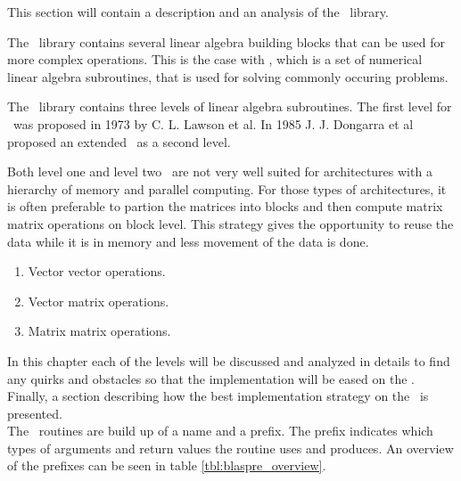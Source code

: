 This section will contain a description and an analysis of the
\BLAS\ library. 

The \BLAS\ library contains several linear algebra building blocks
that can be used for more complex operations. This is the case with
\LAPACK{}, which is a set of numerical linear algebra subroutines, that
is used for solving commonly occuring problems.

The \BLAS\ library contains three levels of linear algebra
subroutines. The first level for \BLAS\ was proposed in 1973 by
C. L. Lawson et al\cite{proposal_blas}. In 1985 J. J. Dongarra et al
proposed an extended \BLAS\ as a second
level\cite{proposal_extended_blas}. 

Both level one and level two \BLAS\ are not very well suited for
architectures with a hierarchy of memory and parallel computing. For
those types of architectures, it is often preferable to partion the
matrices into blocks and then compute matrix matrix operations on
block level\cite{blas_level_3}. This strategy gives the opportunity to
reuse the data while it is in memory and less movement of the data is
done.

\begin{enumerate}
\item{Vector vector operations.}
\item{Vector matrix operations.}
\item{Matrix matrix operations.}
\end{enumerate}

In this chapter each of the levels will be discussed and analyzed in
details to find any quirks and obstacles so that the implementation
will be eased on the \CBE{}. Finally, a section describing how the
best implementation strategy on the \CBE\ is presented. \\

The \BLAS\ routines are build up of a name and a prefix. The prefix
indicates which types of arguments and return values the routine uses
and produces. An overview of the prefixes can be seen in
table \ref{tbl:blaspre_overview}.

